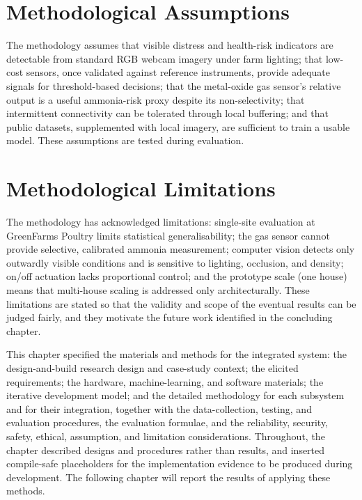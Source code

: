 \documentclass[12pt,a4paper]{report}
\begin{document}
\section{Methodological Assumptions}

The methodology assumes that visible distress and health-risk indicators are detectable from standard RGB webcam imagery under farm lighting; that low-cost sensors, once validated against reference instruments, provide adequate signals for threshold-based decisions; that the metal-oxide gas sensor's relative output is a useful ammonia-risk proxy despite its non-selectivity; that intermittent connectivity can be tolerated through local buffering; and that public datasets, supplemented with local imagery, are sufficient to train a usable model. These assumptions are tested during evaluation.

\section{Methodological Limitations}

The methodology has acknowledged limitations: single-site evaluation at GreenFarms Poultry limits statistical generalisability; the gas sensor cannot provide selective, calibrated ammonia measurement; computer vision detects only outwardly visible conditions and is sensitive to lighting, occlusion, and density; on/off actuation lacks proportional control; and the prototype scale (one house) means that multi-house scaling is addressed only architecturally. These limitations are stated so that the validity and scope of the eventual results can be judged fairly, and they motivate the future work identified in the concluding chapter.

This chapter specified the materials and methods for the integrated system: the design-and-build research design and case-study context; the elicited requirements; the hardware, machine-learning, and software materials; the iterative development model; and the detailed methodology for each subsystem and for their integration, together with the data-collection, testing, and evaluation procedures, the evaluation formulae, and the reliability, security, safety, ethical, assumption, and limitation considerations. Throughout, the chapter described designs and procedures rather than results, and inserted compile-safe placeholders for the implementation evidence to be produced during development. The following chapter will report the results of applying these methods.
\end{document}
